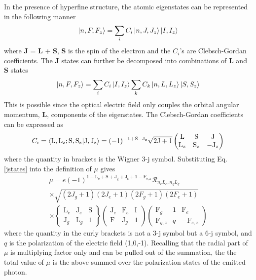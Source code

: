 In the presence of hyperfine structure, the atomic eigenstates can be represented in the following manner
\begin{equation}
\ket{n,F,F_z} = \sum_iC_i\ket{n,J,J_z}\ket{I,I_z}
\label{jstates}
\end{equation}
where \textbf{J}  =\textbf{ L} + \textbf{S}, \textbf{S} is the spin of the electron and the $C_i$'s are Clebsch-Gordan coefficients. The \textbf{J} states can further be decomposed into combinations of \textbf{L} and \textbf{S} states
\begin{equation}
\ket{n,F,F_z} = \sum_iC_i\ket{I,I_z}\sum_kC_k\ket{n,L,L_z}\ket{S,S_z}
\label{jstates}
\end{equation}
This is possible since the optical electric field only couples the orbital angular momentum, \textbf{L}, components of the eigenstates.  The Clebsch-Gordan coefficients can be expressed as
\begin{equation}
C_i = \braket{\mathrm{L,L_z ; S,S_z}|\mathrm{J,J_z}}=(-1)^{\mathrm{-L+S-J_z}}\sqrt{\mathrm{2J+1}}
\left(
\begin{matrix}
\mathrm{L} & \mathrm{S} & \mathrm{J}\\
\mathrm{L}_z & \mathrm{S}_z & -\mathrm{J}_z
\end{matrix}
\right)
\end{equation}
where the quantity in brackets is the Wigner 3-j symbol.
Substituting Eq. \ref{jstates} into the definition of $\mu$ gives 
\begin{equation}
\begin{split}
\mu = e (-1)^{\mathrm{1+L_e+S+J_g+J_s+1-F_{e,z}}}\mathcal{R}_{n_e L_e, n_g L_g}\\
\times \sqrt{(2J_g+1)(2J_e+1)(2F_g+1)(2F_e+1)}\\
\times \left\lbrace
\begin{matrix}
\mathrm{L}_e & \mathrm{J}_e & \mathrm{S}\\
\mathrm{J}_g & \mathrm{L}_g & 1
\end{matrix}
\right\rbrace
\left(
\begin{matrix}
\mathrm{J}_e & \mathrm{F}_e & \mathrm{I}\\
\mathrm{F} & \mathrm{J}_g &1
\end{matrix}
\right)
\left(
\begin{matrix}
\mathrm{F}_g & 1 & \mathrm{F}_e\\
\mathrm{F}_{g,z} & q &-\mathrm{F}_{e,z}
\end{matrix}
\right)
\end{split}
\end{equation}
where the quantity in the curly brackets is not a 3-j symbol but a 6-j symbol, and $q$ is the polarization of the electric field (1,0,-1). Recalling that the radial part of $\mu$ is multiplying factor only and can be pulled out of the summation, the the total value of $\mu$ is the above summed over the polarization states of the emitted photon.

